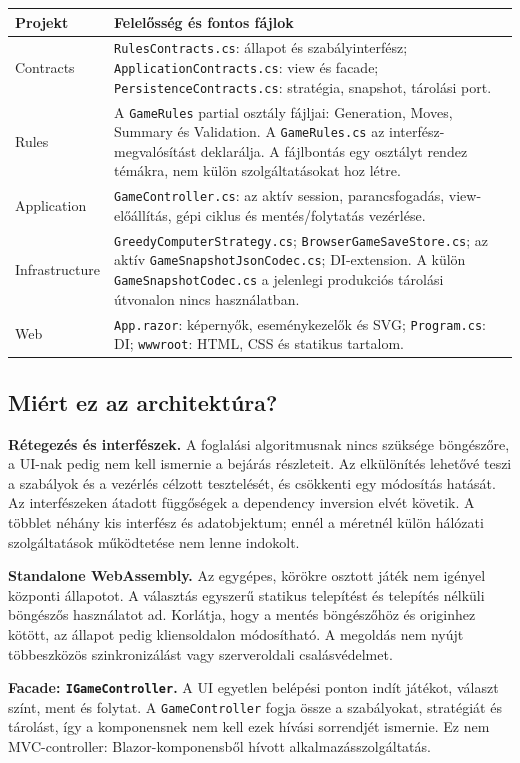 \documentclass[11pt,a4paper]{article}
\newcommand{\code}[1]{\nolinkurl{#1}}
\begin{document}
\begin{tabularx}{\linewidth}{@{}lY@{}}\toprule
Projekt & Felelősség és fontos fájlok \\\midrule
Contracts & \code{RulesContracts.cs}: állapot és szabályinterfész; \code{ApplicationContracts.cs}: view és facade; \code{PersistenceContracts.cs}: stratégia, snapshot, tárolási port.\\
Rules & A \code{GameRules} partial osztály fájljai: Generation, Moves, Summary és Validation. A \code{GameRules.cs} az interfész-megvalósítást deklarálja. A fájlbontás egy osztályt rendez témákra, nem külön szolgáltatásokat hoz létre.\\
Application & \code{GameController.cs}: az aktív session, parancsfogadás, view-előállítás, gépi ciklus és mentés/folytatás vezérlése.\\
Infrastructure & \code{GreedyComputerStrategy.cs}; \code{BrowserGameSaveStore.cs}; az aktív \code{GameSnapshotJsonCodec.cs}; DI-extension. A külön \code{GameSnapshotCodec.cs} a jelenlegi produkciós tárolási útvonalon nincs használatban.\\
Web & \code{App.razor}: képernyők, eseménykezelők és SVG; \code{Program.cs}: DI; \code{wwwroot}: HTML, CSS és statikus tartalom.\\\bottomrule
\end{tabularx}

\subsection{Miért ez az architektúra?}
\textbf{Rétegezés és interfészek.} A foglalási algoritmusnak nincs szüksége böngészőre, a UI-nak pedig nem kell ismernie a bejárás részleteit. Az elkülönítés lehetővé teszi a szabályok és a vezérlés célzott tesztelését, és csökkenti egy módosítás hatását. Az interfészeken átadott függőségek a dependency inversion elvét követik. A többlet néhány kis interfész és adatobjektum; ennél a méretnél külön hálózati szolgáltatások működtetése nem lenne indokolt.

\textbf{Standalone WebAssembly.} Az egygépes, körökre osztott játék nem igényel központi állapotot. A választás egyszerű statikus telepítést és telepítés nélküli böngészős használatot ad. Korlátja, hogy a mentés böngészőhöz és originhez kötött, az állapot pedig kliensoldalon módosítható. A megoldás nem nyújt többeszközös szinkronizálást vagy szerveroldali csalásvédelmet.

\textbf{Facade: \code{IGameController}.} A UI egyetlen belépési ponton indít játékot, választ színt, ment és folytat. A \code{GameController} fogja össze a szabályokat, stratégiát és tárolást, így a komponensnek nem kell ezek hívási sorrendjét ismernie. Ez nem MVC-controller: Blazor-komponensből hívott alkalmazásszolgáltatás.
\end{document}
